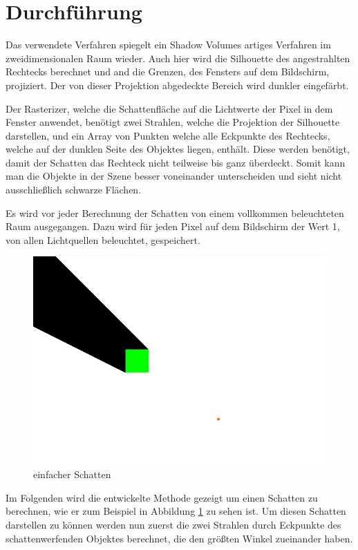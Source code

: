 \section{Durchführung}

Das verwendete Verfahren spiegelt ein Shadow Volumes artiges Verfahren im zweidimensionalen Raum wieder. Auch hier wird die Silhouette des angestrahlten Rechtecks berechnet und and die Grenzen, des Fensters auf dem Bildschirm, projiziert. Der von dieser Projektion abgedeckte Bereich wird dunkler eingefärbt.

Der Rasterizer, welche die Schattenfläche auf die Lichtwerte der Pixel in dem Fenster anwendet, benötigt zwei Strahlen, welche die Projektion der Silhouette darstellen, und ein Array von Punkten welche alle Eckpunkte des Rechtecks, welche auf der dunklen Seite des Objektes liegen, enthält. Diese werden benötigt, damit der Schatten das Rechteck nicht teilweise bis ganz überdeckt. Somit kann man die Objekte in der Szene besser voneinander unterscheiden und sieht nicht ausschließlich schwarze Flächen.

Es wird vor jeder Berechnung der Schatten von einem vollkommen beleuchteten Raum ausgegangen. Dazu wird für jeden Pixel auf dem Bildschirm der Wert 1, von allen Lichtquellen beleuchtet, gespeichert.

\begin{figure}[t]
	\centering
	\includegraphics[width=\columnwidth]{images/durchfuehrung.png}
	\caption{einfacher Schatten}
	\label{fig:durch1}
\end{figure}

Im Folgenden wird die entwickelte Methode gezeigt um einen Schatten zu berechnen, wie er zum Beispiel in Abbildung \ref{fig:durch1} zu sehen ist. Um diesen Schatten darstellen zu können werden nun zuerst die zwei Strahlen durch Eckpunkte des schattenwerfenden Objektes berechnet, die den größten Winkel zueinander haben.

